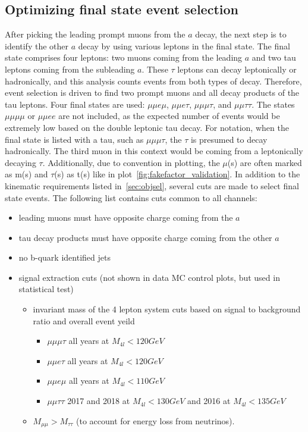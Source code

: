\subsection{Optimizing final state event selection}
After picking the leading prompt muons from the $a$ decay, the next step is to identify the other $a$ decay by using various leptons in the final state. The final state comprises four leptons: two muons coming from the leading $a$ and two tau leptons coming from the subleading $a$. These $\tau$ leptons can decay leptonically or hadronically, and this analysis counts events from both types of decay. Therefore, event selection is driven to find two prompt muons and all decay products of the tau leptons. Four final states are used: $\mu\mu e \mu$, $\mu\mu e \tau$, $\mu\mu\mu\tau$, and $\mu\mu\tau\tau$. 
The states $\mu\mu\mu\mu$ or $\mu\mu e e $ are not included, as the expected number of events would be extremely low based on the double leptonic tau decay. 
For notation, when the final state is listed with a tau, such as $\mu\mu\mu\tau$, the $\tau$ is presumed to decay hadronically. The third muon in this context would be coming from a leptonically decaying $\tau$. Additionally, due to convention in plotting, the $\mu$(s) are often marked as m(s) and $\tau$(s) as t(s) like in plot~\ref{fig:fakefactor_validation}.
In addition to the kinematic requirements listed in~\ref{sec:objsel}, several cuts are made to select final state events. The following list contains cuts common to all channels:
\begin{itemize}
    \item leading muons must have opposite charge coming from the $a$
    \item tau decay products must have opposite charge coming from the other $a$
    \item no b-quark identified jets 
    \item signal extraction cuts (not shown in data MC control plots, but used in statistical test)
    \begin{itemize}
    \item invariant mass of the 4 lepton system cuts based on signal to background ratio and overall event yeild
    \begin{itemize}
        \item $\mu\mu\mu\tau$ all years at $M_{4l}<120GeV$
        \item $\mu\mu e \tau$ all years at $M_{4l}<120GeV$
        \item $\mu\mu e \mu$ all years at $M_{4l}<110GeV$
        \item $\mu\mu\tau\tau$ 2017 and 2018 at $M_{4l}<130GeV$ and 2016 at $M_{4l}<135GeV$
    \end{itemize}
    \item $M_{\mu\mu} > M_{\tau\tau}$ (to account for energy loss from neutrinos).
    \end{itemize}
\end{itemize}

